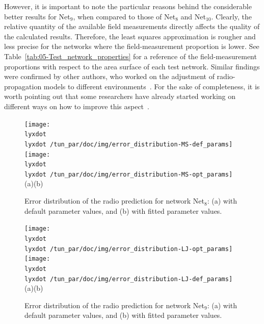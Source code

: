 However, it is important to note the particular reasons behind the
considerable better results for Net$_{9}$, when compared to those
of Net$_{8}$ and Net$_{10}$. Clearly, the relative quantity of the
available field measurements directly affects the quality of the calculated
results. Therefore, the least squares approximation is rougher and
less precise for the networks where the field-measurement proportion
is lower. See Table~\ref{tab:05-Test_network_properties} for a reference
of the field-measurement proportions with respect to the area surface
of each test network. Similar findings were confirmed by other authors,
who worked on the adjustment of radio-propagation models to different
environments~\cite{Huang_Online_propagation_model_correction_based_on_PSO_algorithm_in_LTE_SON_system:2012}.
For the sake of completeness, it is worth pointing out that some researchers
have already started working on different ways on how to improve this
aspect~\cite{Neuland_Influence_of_Different_Factors_on_X_Map_Estimation_in_LTE:2011,Neuland_Influence_of_positioning_error_on_X_Map_estimation_in_LTE:2011}.

\begin{figure}
\centering

\texttt{[image: \\lyxdot \\lyxdot /tun\_par/doc/img/error\_distribution-MS-def\_params]}\texttt{[image: \\lyxdot \\lyxdot /tun\_par/doc/img/error\_distribution-MS-opt\_params]}\\\hspace{0.4cm}(a)\hspace{6.7cm}(b)

\caption{Error distribution of the radio prediction for network Net$_{8}$:
(a) with default parameter values, and (b) with fitted parameter values.\label{fig:05-Error_distribution_for_Net8}}
\end{figure}


\begin{figure}[h]
\centering

\texttt{[image: \\lyxdot \\lyxdot /tun\_par/doc/img/error\_distribution-LJ-opt\_params]}\texttt{[image: \\lyxdot \\lyxdot /tun\_par/doc/img/error\_distribution-LJ-def\_params]}\\\hspace{0.4cm}(a)\hspace{6.7cm}(b)

\caption{Error distribution of the radio prediction for network Net$_{9}$:
(a) with default parameter values, and (b) with fitted parameter values.\label{fig:05-Error_distribution_for_Net9}}
\end{figure}


